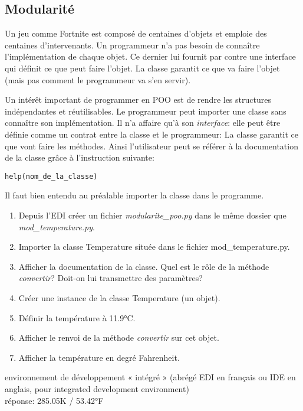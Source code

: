 \documentclass[a4paper,11pt]{article}
\begin{document}
\begin{Form}
\section{Modularité}
\begin{commentprof}
Un jeu comme Fortnite est composé de centaines d'objets et emploie des centaines d'intervenants. Un programmeur n'a pas besoin de connaître l'implémentation de chaque objet. Ce dernier lui fournit par contre une interface qui définit ce que peut faire l'objet. La classe garantit ce que va faire l'objet (mais pas comment le programmeur va s'en servir).
\end{commentprof}
Un intérêt important de programmer en POO est de rendre les structures indépendantes et réutilisables. Le programmeur peut importer une classe sans connaître son implémentation. Il n'a affaire qu'à son \emph{interface}: elle peut être définie comme un contrat entre la classe et le programmeur: La classe garantit ce que vont faire les méthodes.
Ainsi l'utilisateur peut se référer à la documentation de la classe grâce à l'instruction suivante:
\begin{lstlisting}
help(nom_de_la_classe)
\end{lstlisting}
Il faut bien entendu au préalable importer la classe dans le programme.
\begin{activite}
\begin{enumerate}
\item Depuis l'EDI créer un fichier \emph{modularite\_poo.py} dans le même dossier que \emph{mod\_temperature.py}.
\item Importer la classe Temperature située dans le fichier mod\_temperature.py.
\item Afficher la documentation de la classe. Quel est le rôle de la méthode \emph{convertir}? Doit-on lui transmettre des paramètres?
\item Créer une instance de la classe Temperature (un objet).
\item Définir la température à 11.9°C.
\item Afficher le renvoi de la méthode \emph{convertir} sur cet objet.
\item Afficher la température en degré Fahrenheit.
\end{enumerate}
\begin{commentprof}
environnement de développement « intégré » (abrégé EDI en français ou IDE en anglais, pour integrated development environment)\\réponse: 285.05K / 53.42°F
\end{commentprof}
\end{activite}
\pagebreak

\end{Form}
\end{document}
